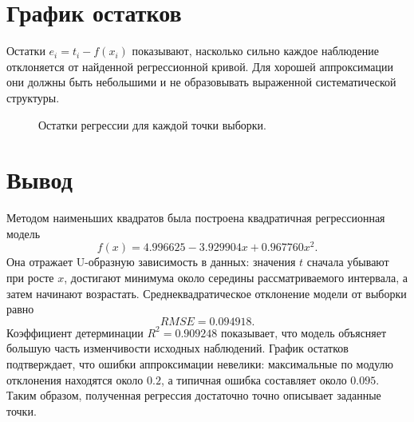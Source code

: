\documentclass[12pt,a4paper]{article}
\begin{document}
\section*{График остатков}
Остатки $e_i=t_i-f(x_i)$ показывают, насколько сильно каждое наблюдение
отклоняется от найденной регрессионной кривой. Для хорошей аппроксимации они
должны быть небольшими и не образовывать выраженной систематической структуры.

\begin{figure}[H]
\centering
{}
\caption{Остатки регрессии для каждой точки выборки.}
\end{figure}

\section*{Вывод}
Методом наименьших квадратов была построена квадратичная регрессионная модель
\[
    f(x)=4.996625-3.929904x+0.967760x^2.
\]
Она отражает U-образную зависимость в данных: значения $t$ сначала убывают при
росте $x$, достигают минимума около середины рассматриваемого интервала, а затем
начинают возрастать. Среднеквадратическое отклонение модели от выборки равно
\[
    RMSE=0.094918.
\]
Коэффициент детерминации $R^2=0.909248$ показывает, что модель объясняет
большую часть изменчивости исходных наблюдений. График остатков подтверждает,
что ошибки аппроксимации невелики: максимальные по модулю отклонения находятся
около $0.2$, а типичная ошибка составляет около $0.095$.
Таким образом, полученная регрессия достаточно точно описывает заданные точки.
\end{document}
